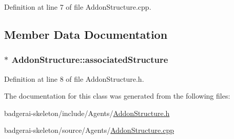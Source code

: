 Definition at line 7 of file Addon\-Structure.\-cpp.


\begin{DoxyCode}
{
}
\end{DoxyCode}


\subsection{Member Data Documentation}
\hypertarget{classAddonStructure_a24522f08102d9f59a4cf4428d47b8989}{
\subsubsection[{associated\-Structure}]{$\ast$ {\bf Addon\-Structure\-::associated\-Structure}}}\label{classAddonStructure_a24522f08102d9f59a4cf4428d47b8989}


Definition at line 8 of file Addon\-Structure.\-h.



The documentation for this class was generated from the following files\-:\begin{DoxyCompactItemize}
\item 
badgerai-\/skeleton/include/\-Agents/\hyperlink{AddonStructure_8h}{Addon\-Structure.\-h}\item 
badgerai-\/skeleton/source/\-Agents/\hyperlink{AddonStructure_8cpp}{Addon\-Structure.\-cpp}\end{DoxyCompactItemize}
